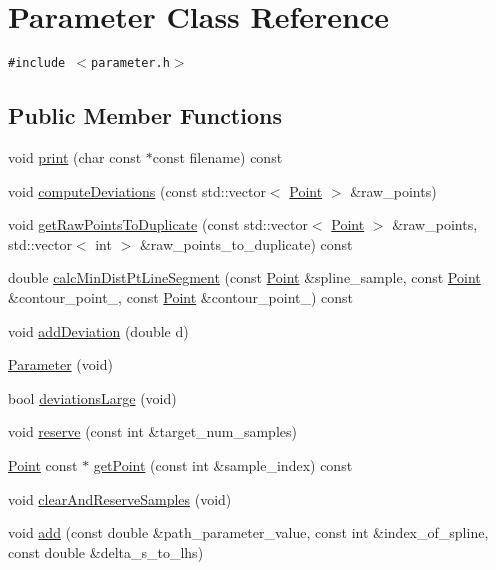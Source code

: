 \hypertarget{classParameter}{
\section{Parameter Class Reference}
\label{classParameter}
}
{\tt \#include $<$parameter.h$>$}

\subsection*{Public Member Functions}
\begin{CompactItemize}
\item 
void \hyperlink{classParameter_54d870873dcf44d515ab5384a38de7af}{print} (char const $\ast$const filename) const 
\item 
void \hyperlink{classParameter_c3fd9360e62e3b9fe764a95e8f3e2b50}{computeDeviations} (const std::vector$<$ \hyperlink{classPoint}{Point} $>$ \&raw\_\-points)
\item 
void \hyperlink{classParameter_918287332cac92ccf75c78fb651efc97}{getRawPointsToDuplicate} (const std::vector$<$ \hyperlink{classPoint}{Point} $>$ \&raw\_\-points, std::vector$<$ int $>$ \&raw\_\-points\_\-to\_\-duplicate) const 
\item 
double \hyperlink{classParameter_db51977acf04748c2d4a82a619459c0d}{calcMinDistPtLineSegment} (const \hyperlink{classPoint}{Point} \&spline\_\-sample, const \hyperlink{classPoint}{Point} \&contour\_\-point\_, const \hyperlink{classPoint}{Point} \&contour\_\-point\_) const 
\item 
void \hyperlink{classParameter_ff6c2b408f89720293ec4db6ef186c3f}{addDeviation} (double d)
\item 
\hyperlink{classParameter_b1939f6d4bacbd505ead9dfafcd2647f}{Parameter} (void)
\item 
bool \hyperlink{classParameter_ec98b30f1dfebcb04e504adadb4a5787}{deviationsLarge} (void)
\item 
void \hyperlink{classParameter_8db6db4bd306208ccfbf94ef04d39955}{reserve} (const int \&target\_\-num\_\-samples)
\item 
\hyperlink{classPoint}{Point} const $\ast$ \hyperlink{classParameter_21bfc1fa9f7999cd18429493fef88485}{getPoint} (const int \&sample\_\-index) const 
\item 
void \hyperlink{classParameter_90c14f9388c291ebd0199b542ea3eaa2}{clearAndReserveSamples} (void)
\item 
void \hyperlink{classParameter_baa819bda68eaca98d6d78bde5c65f1b}{add} (const double \&path\_\-parameter\_\-value, const int \&index\_\-of\_\-spline, const double \&delta\_\-s\_\-to\_\-lhs)

\end{CompactItemize}
